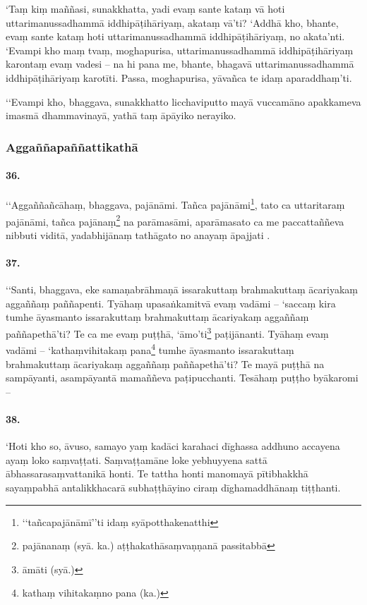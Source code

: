 ‘Taṃ kiṃ maññasi, sunakkhatta, yadi evaṃ sante kataṃ vā hoti uttarimanussadhammā iddhipāṭihāriyaṃ, akataṃ vā’ti? ‘Addhā kho, bhante, evaṃ sante kataṃ hoti uttarimanussadhammā iddhipāṭihāriyaṃ, no akata’nti. ‘Evampi kho maṃ tvaṃ, moghapurisa, uttarimanussadhammā iddhipāṭihāriyaṃ karontaṃ evaṃ vadesi – na hi pana me, bhante, bhagavā uttarimanussadhammā iddhipāṭihāriyaṃ karotīti. Passa, moghapurisa, yāvañca te idaṃ aparaddhaṃ’ti.

‘‘Evampi kho, bhaggava, sunakkhatto licchaviputto mayā vuccamāno apakkameva imasmā dhammavinayā, yathā taṃ āpāyiko nerayiko.

\subsubsection{Aggaññapaññattikathā}

\paragraph{36.} ‘‘Aggaññañcāhaṃ, bhaggava, pajānāmi. Tañca pajānāmi\footnote{‘‘tañcapajānāmī’’ti idaṃ syāpotthakenatthi}, tato ca uttaritaraṃ pajānāmi, tañca pajānaṃ\footnote{pajānanaṃ (syā. ka.) aṭṭhakathāsaṃvaṇṇanā passitabbā} na parāmasāmi, aparāmasato ca me paccattaññeva nibbuti viditā, yadabhijānaṃ tathāgato no anayaṃ āpajjati .

\paragraph{37.} ‘‘Santi, bhaggava, eke samaṇabrāhmaṇā issarakuttaṃ brahmakuttaṃ ācariyakaṃ aggaññaṃ paññapenti. Tyāhaṃ upasaṅkamitvā evaṃ vadāmi – ‘saccaṃ kira tumhe āyasmanto issarakuttaṃ brahmakuttaṃ ācariyakaṃ aggaññaṃ paññapethā’ti? Te ca me evaṃ puṭṭhā, ‘āmo’ti\footnote{āmāti (syā.)} paṭijānanti. Tyāhaṃ evaṃ vadāmi – ‘kathaṃvihitakaṃ pana\footnote{kathaṃ vihitakaṃno pana (ka.)} tumhe āyasmanto issarakuttaṃ brahmakuttaṃ ācariyakaṃ aggaññaṃ paññapethā’ti? Te mayā puṭṭhā na sampāyanti, asampāyantā mamaññeva paṭipucchanti. Tesāhaṃ puṭṭho byākaromi –

\paragraph{38.} ‘Hoti kho so, āvuso, samayo yaṃ kadāci karahaci dīghassa addhuno accayena ayaṃ loko saṃvaṭṭati. Saṃvaṭṭamāne loke yebhuyyena sattā ābhassarasaṃvattanikā honti. Te tattha honti manomayā pītibhakkhā sayaṃpabhā antalikkhacarā subhaṭṭhāyino ciraṃ dīghamaddhānaṃ tiṭṭhanti.

